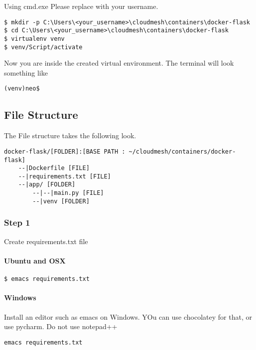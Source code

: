 Using cmd.exe Please replace with your username.

\begin{lstlisting}
$ mkdir -p C:\Users\<your_username>\cloudmesh\containers\docker-flask
$ cd C:\Users\<your_username>\cloudmesh\containers\docker-flask
$ virtualenv venv
$ venv/Script/activate
\end{lstlisting}

Now you are inside the created virtual environment. The terminal will
look something like

\begin{lstlisting}
(venv)neo$
\end{lstlisting}

\subsection{File Structure}

The File structure takes the following look.

\begin{lstlisting}
docker-flask/[FOLDER]:[BASE PATH : ~/cloudmesh/containers/docker-flask]
    --|Dockerfile [FILE]
    --|requirements.txt [FILE]
    --|app/ [FOLDER]
        --|--|main.py [FILE]
        --|venv [FOLDER]
\end{lstlisting}

\subsubsection{Step 1}

Create requirements.txt file

\paragraph{Ubuntu and OSX}

\begin{lstlisting}
$ emacs requirements.txt
\end{lstlisting}

\paragraph{Windows}

Install an editor such as emacs on Windows. YOu can use chocolatey for
that, or use pycharm. Do not use notepad++

\begin{lstlisting}
emacs requirements.txt
\end{lstlisting}

